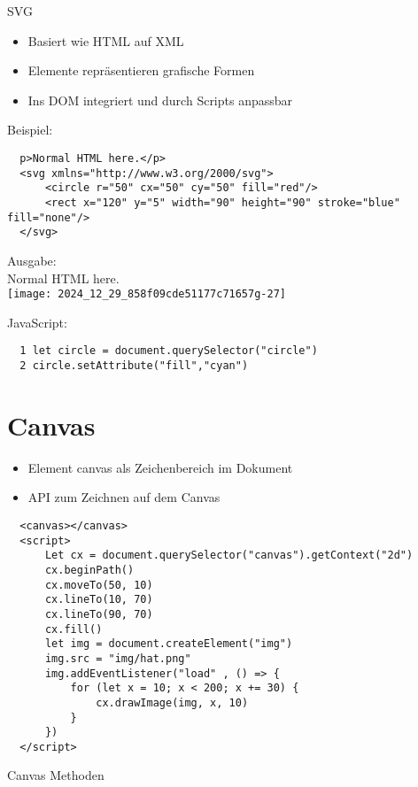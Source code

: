   SVG
  
  \begin{itemize}
    \item Basiert wie HTML auf XML
    \item Elemente repräsentieren grafische Formen
    \item Ins DOM integriert und durch Scripts anpassbar
  \end{itemize}
  
  Beispiel:
  
  \begin{verbatim}
  p>Normal HTML here.</p>
  <svg xmlns="http://www.w3.org/2000/svg">
      <circle r="50" cx="50" cy="50" fill="red"/>
      <rect x="120" y="5" width="90" height="90" stroke="blue" fill="none"/>
  </svg>
  \end{verbatim}
  
  Ausgabe:\\
  Normal HTML here.\\
  \texttt{[image: 2024\_12\_29\_858f09cde51177c71657g-27]}
  
  JavaScript:
  
  \begin{verbatim}
  1 let circle = document.querySelector("circle")
  2 circle.setAttribute("fill","cyan")
  \end{verbatim}
  
  \section*{Canvas}
  \begin{itemize}
    \item Element canvas als Zeichenbereich im Dokument
    \item API zum Zeichnen auf dem Canvas
  \end{itemize}
  
  \begin{verbatim}
  <canvas></canvas>
  <script>
      Let cx = document.querySelector("canvas").getContext("2d")
      cx.beginPath()
      cx.moveTo(50, 10)
      cx.lineTo(10, 70)
      cx.lineTo(90, 70)
      cx.fill()
      let img = document.createElement("img")
      img.src = "img/hat.png"
      img.addEventListener("load" , () => {
          for (let x = 10; x < 200; x += 30) {
              cx.drawImage(img, x, 10)
          }
      })
  </script>
  \end{verbatim}
  
  Canvas Methoden
  
